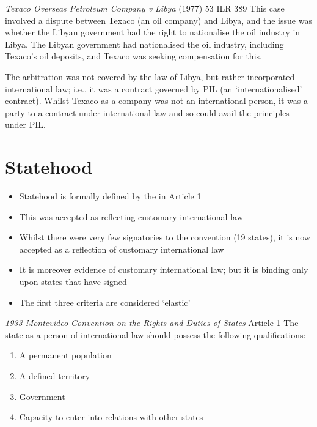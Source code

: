 \begin{casedetails}{\textit{Texaco Overseas Petroleum Company v Libya} (1977) 53 ILR 389}
    \flushleft
    This case involved a dispute between Texaco (an oil company) and Libya, and the issue was whether the Libyan government had the right to nationalise the oil industry in Libya. The Libyan government had nationalised the oil industry, including Texaco's oil deposits, and Texaco was seeking compensation for this.

    \vspace{\baselineskip}

    The arbitration was not covered by the law of Libya, but rather incorporated international law; i.e., it was a contract governed by PIL (an `internationalised' contract). Whilst Texaco as a company was not an international person, it was a party to a contract under international law and so could avail the principles under PIL.
\end{casedetails}

\section{Statehood}
\begin{itemize}
    \item Statehood is formally defined by the  in Article 1
    \item This was accepted as reflecting customary international law
    \item Whilst there were very few signatories to the convention (19 states), it is now accepted as a reflection of customary international law
    \item It is moreover evidence of customary international law; but it is binding only upon states that have signed 
    \item The first three criteria are considered `elastic'
\end{itemize}

\begin{conventiondetails}{\textit{1933 Montevideo Convention on the Rights and Duties of States} Article 1}
    \flushleft
    The state as a person of international law should possess the following qualifications:
    \begin{enumerate}
        \item A permanent population
        \item A defined territory
        \item Government
        \item Capacity to enter into relations with other states
    \end{enumerate}
\end{conventiondetails}

